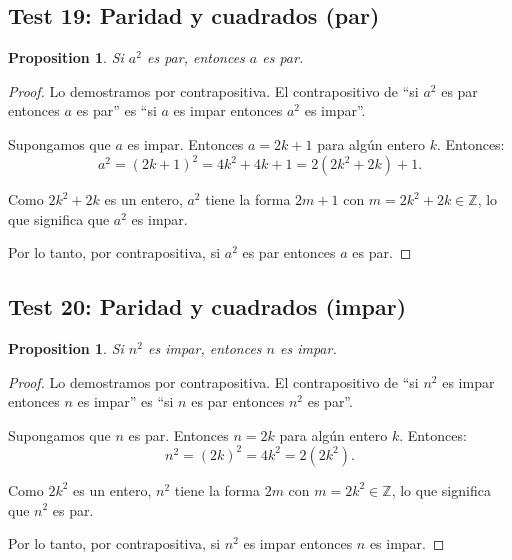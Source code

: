 \documentclass[11pt,a4paper]{article}
\theoremstyle{plain}
\newtheorem{proposition}[theorem]{Proposition}
\theoremstyle{definition}
\begin{document}
\subsection*{Test 19: Paridad y cuadrados (par)}

\begin{proposition}
Si $a^2$ es par, entonces $a$ es par.
\end{proposition}

\begin{proof}
Lo demostramos por contrapositiva. El contrapositivo de ``si $a^2$ es par entonces $a$ es par'' es ``si $a$ es impar entonces $a^2$ es impar''.

Supongamos que $a$ es impar. Entonces $a = 2k + 1$ para algún entero $k$. Entonces:
\[
a^2 = (2k+1)^2 = 4k^2 + 4k + 1 = 2(2k^2 + 2k) + 1.
\]

Como $2k^2 + 2k$ es un entero, $a^2$ tiene la forma $2m + 1$ con $m = 2k^2 + 2k \in \mathbb{Z}$, lo que significa que $a^2$ es impar.

Por lo tanto, por contrapositiva, si $a^2$ es par entonces $a$ es par.
\end{proof}

\subsection*{Test 20: Paridad y cuadrados (impar)}

\begin{proposition}
Si $n^2$ es impar, entonces $n$ es impar.
\end{proposition}

\begin{proof}
Lo demostramos por contrapositiva. El contrapositivo de ``si $n^2$ es impar entonces $n$ es impar'' es ``si $n$ es par entonces $n^2$ es par''.

Supongamos que $n$ es par. Entonces $n = 2k$ para algún entero $k$. Entonces:
\[
n^2 = (2k)^2 = 4k^2 = 2(2k^2).
\]

Como $2k^2$ es un entero, $n^2$ tiene la forma $2m$ con $m = 2k^2 \in \mathbb{Z}$, lo que significa que $n^2$ es par.

Por lo tanto, por contrapositiva, si $n^2$ es impar entonces $n$ es impar.
\end{proof}
\end{document}

